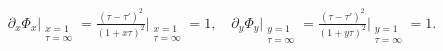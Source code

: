 \documentclass[aps,rmp,twocolumn,groupedaddress,floatfix,notitlepage]{revtex4-1}
\begin{document}
\begin{align}
    \partial_x \Phi_x \Bigg\vert_{\substack{x=1 \\ \tau=\infty}} = 
    \frac{(\tau-\tau')^2}{(1+x\tau)^2} \Bigg\vert_{\substack{x=1 \\ \tau=\infty}} = 1, \quad
    \partial_y \Phi_y \Bigg\vert_{\substack{y=1 \\ \tau=\infty}} =
    \frac{(\tau-\tau')^2}{(1+y\tau)^2} \Bigg\vert_{\substack{y=1 \\ \tau=\infty}} = 1.
\end{align}


\end{document}
